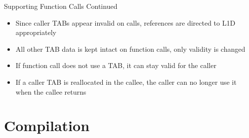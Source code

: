 \documentclass{beamer}
\begin{document}
\begin{frame}{Supporting Function Calls Continued}
   \begin{itemize}
      \item Since caller TABs appear invalid on calls, references are directed to
         L1D appropriately
      \item All other TAB data is kept intact on function calls, 
         only validity is changed
      \item If function call does not use a TAB, it can stay valid for the caller
      \item If a caller TAB is reallocated in the callee, the caller can no longer
         use it when the callee returns
   \end{itemize}
\end{frame}
\section{Compilation}
\end{document}
